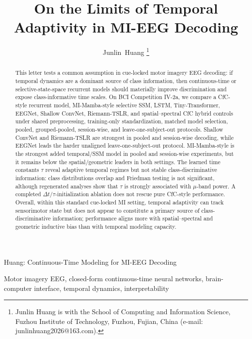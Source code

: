 \documentclass[journal]{IEEEtran}
\begin{document}
\title{On the Limits of Temporal Adaptivity in MI-EEG Decoding}

\author{Junlin~Huang%
\thanks{Junlin Huang is with the School of Computing and Information Science, Fuzhou Institute of Technology, Fuzhou, Fujian, China (e-mail: junlinhuang2026@163.com).}}

%
{Huang: Continuous-Time Modeling for MI-EEG Decoding}
\maketitle

\begin{abstract}
This letter tests a common assumption in cue-locked motor imagery EEG decoding: if temporal dynamics are a dominant source of class information, then continuous-time or selective-state-space recurrent models should materially improve discrimination and expose class-informative time scales. On BCI Competition IV-2a, we compare a CfC-style recurrent model, MI-Mamba-style selective SSM, LSTM, Tiny-Transformer, EEGNet, Shallow ConvNet, Riemann-TSLR, and spatial--spectral CfC hybrid controls under shared preprocessing, training-only standardization, matched model selection, pooled, grouped-pooled, session-wise, and leave-one-subject-out protocols. Shallow ConvNet and Riemann-TSLR are strongest in pooled and session-wise decoding, while EEGNet leads the harder unaligned leave-one-subject-out protocol. MI-Mamba-style is the strongest added temporal/SSM model in pooled and session-wise experiments, but it remains below the spatial/geometric leaders in both settings. The learned time constants $\tau$ reveal adaptive temporal regimes but not stable class-discriminative information: class distributions overlap and Friedman testing is not significant, although regenerated analyses show that $\tau$ is strongly associated with $\mu$-band power. A completed $\Delta t$/$\tau$-initialization ablation does not rescue pure CfC-style performance. Overall, within this standard cue-locked MI setting, temporal adaptivity can track sensorimotor state but does not appear to constitute a primary source of class-discriminative information; performance aligns more with spatial--spectral and geometric inductive bias than with temporal modeling capacity.
\end{abstract}

\begin{IEEEkeywords}
Motor imagery EEG, closed-form continuous-time neural networks, brain-computer interface, temporal dynamics, interpretability
\end{IEEEkeywords}
\end{document}
